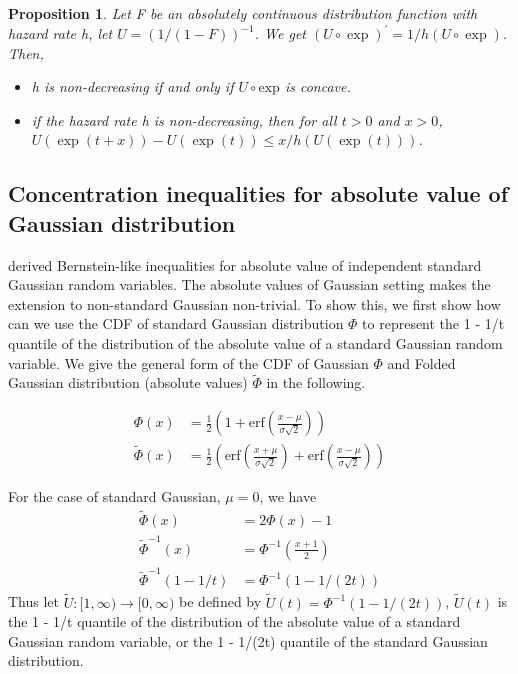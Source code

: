 \documentclass{article}
\theoremstyle{plain}
\newtheorem{prop}{Proposition}
\begin{document}
\begin{prop}
\label{prop non-increasing hazard rate}
Let F be an absolutely continuous distribution function with hazard
rate h, let $U=(1 /(1-F))^{-1}$. We get $(U \circ \exp )^{\prime}=1 / h(U \circ \exp )$. Then, 
\begin{itemize}
    \item h is non-decreasing if and only if $U \circ \mathrm{exp}$ is concave.
    \item if the hazard rate h is non-decreasing, then for all $t > 0$ and $x > 0$, $U(\exp (t+x))-U(\exp (t)) \leq x / h(U(\exp (t)))$.
\end{itemize}
\end{prop}

\subsection{Concentration inequalities for absolute value of Gaussian distribution}

\cite{boucheron2012} derived Bernstein-like inequalities for absolute value of independent standard Gaussian random variables. The absolute values of Gaussian setting makes the extension to non-standard Gaussian non-trivial. To show this, we first show how can we use the CDF of standard Gaussian distribution $\Phi$ to represent the 1 - 1/t quantile of the distribution of the absolute value of a standard Gaussian random variable. We give the general form of the CDF of Gaussian $\Phi$ and Folded Gaussian distribution (absolute values) $\tilde{\Phi}$ in the following.

\begin{align}
    \Phi(x) &= \frac{1}{2}\left(1 + \text{erf}(\frac{x - \mu}{\sigma \sqrt{2}})\right)\\
    \tilde{\Phi}(x) &= \frac{1}{2}\left(\text{erf}(\frac{x + \mu}{\sigma \sqrt{2}}) + \text{erf}(\frac{x - \mu}{\sigma \sqrt{2}})\right) 
\end{align}

For the case of standard Gaussian, $\mu = 0$,  we have 
\begin{align}
    \tilde{\Phi}(x) &= 2 \Phi(x) - 1\\
    \tilde{\Phi}^{-1}(x) &= \Phi^{-1}(\frac{x+1}{2})\\
    \tilde{\Phi}^{-1}(1 - 1/t) &= \Phi^{-1}(1 - 1/(2t))
\end{align}
Thus let $\tilde{U} : [ 1, \infty ) \rightarrow[0, \infty)$ be defined by $\widetilde{U}(t)=\Phi^{-1}(1-1 /(2 t))$, $\widetilde{U}(t)$ is the 1 - 1/t quantile of the distribution of the absolute value of a standard Gaussian random variable, or the 1 - 1/(2t) quantile of the standard Gaussian distribution. 
\end{document}
